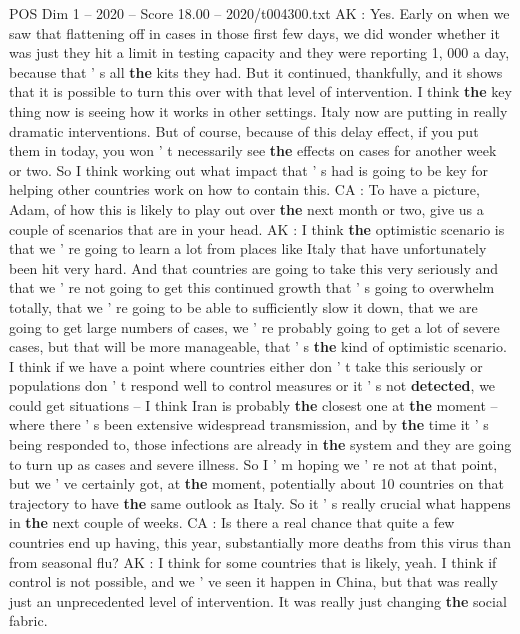 \begin{textsample}{POS Dim 1 – 2020 – Score 18.00 – 2020/t004300.txt}
AK : Yes.
Early on when we saw that flattening off in cases in those first few days, we did wonder whether it was just they hit a limit in testing capacity and they were reporting 1, 000 a day, because that ' s all \textbf{the} kits they had.
But it continued, thankfully, and it shows that it is possible to turn this over with that level of intervention.
I think \textbf{the} key thing now is seeing how it works in other settings.
Italy now are putting in really dramatic interventions.
But of course, because of this delay effect, if you put them in today, you won ' t necessarily see \textbf{the} effects on cases for another week or two.
So I think working out what impact that ' s had is going to be key for helping other countries work on how to contain this.
CA : To have a picture, Adam, of how this is likely to play out over \textbf{the} next month or two, give us a couple of scenarios that are in your head.
AK : I think \textbf{the} optimistic scenario is that we ' re going to learn a lot from places like Italy that have unfortunately been hit very hard.
And that countries are going to take this very seriously and that we ' re not going to get this continued growth that ' s going to overwhelm totally, that we ' re going to be able to sufficiently slow it down, that we are going to get large numbers of cases, we ' re probably going to get a lot of severe cases, but that will be more manageable, that ' s \textbf{the} kind of optimistic scenario.
I think if we have a point where countries either don ' t take this seriously or populations don ' t respond well to control measures or it ' s not \textbf{detected}, we could get situations -- I think Iran is probably \textbf{the} closest one at \textbf{the} moment -- where there ' s been extensive widespread transmission, and by \textbf{the} time it ' s being responded to, those infections are already in \textbf{the} system and they are going to turn up as cases and severe illness.
So I ' m hoping we ' re not at that point, but we ' ve certainly got, at \textbf{the} moment, potentially about 10 countries on that trajectory to have \textbf{the} same outlook as Italy.
So it ' s really crucial what happens in \textbf{the} next couple of weeks.
CA : Is there a real chance that quite a few countries end up having, this year, substantially more deaths from this virus than from seasonal flu?
AK : I think for some countries that is likely, yeah.
I think if control is not possible, and we ' ve seen it happen in China, but that was really just an unprecedented level of intervention.
It was really just changing \textbf{the} social fabric.

\end{textsample}
